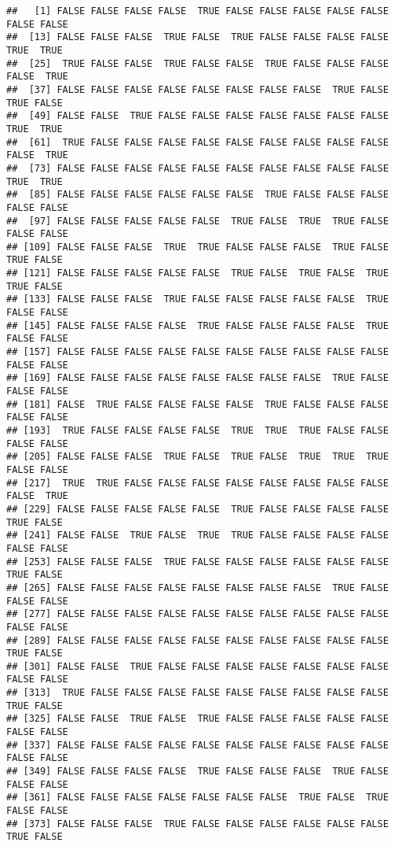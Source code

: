 \documentclass[
]{book}
\begin{document}
\begin{verbatim}
##   [1] FALSE FALSE FALSE FALSE  TRUE FALSE FALSE FALSE FALSE FALSE FALSE FALSE
##  [13] FALSE FALSE FALSE  TRUE FALSE  TRUE FALSE FALSE FALSE FALSE  TRUE  TRUE
##  [25]  TRUE FALSE FALSE  TRUE FALSE FALSE  TRUE FALSE FALSE FALSE FALSE  TRUE
##  [37] FALSE FALSE FALSE FALSE FALSE FALSE FALSE FALSE  TRUE FALSE  TRUE FALSE
##  [49] FALSE FALSE  TRUE FALSE FALSE FALSE FALSE FALSE FALSE FALSE  TRUE  TRUE
##  [61]  TRUE FALSE FALSE FALSE FALSE FALSE FALSE FALSE FALSE FALSE FALSE  TRUE
##  [73] FALSE FALSE FALSE FALSE FALSE FALSE FALSE FALSE FALSE FALSE  TRUE  TRUE
##  [85] FALSE FALSE FALSE FALSE FALSE FALSE  TRUE FALSE FALSE FALSE FALSE FALSE
##  [97] FALSE FALSE FALSE FALSE FALSE  TRUE FALSE  TRUE  TRUE FALSE FALSE FALSE
## [109] FALSE FALSE FALSE  TRUE  TRUE FALSE FALSE FALSE  TRUE FALSE  TRUE FALSE
## [121] FALSE FALSE FALSE FALSE FALSE  TRUE FALSE  TRUE FALSE  TRUE  TRUE FALSE
## [133] FALSE FALSE FALSE  TRUE FALSE FALSE FALSE FALSE FALSE  TRUE FALSE FALSE
## [145] FALSE FALSE FALSE FALSE  TRUE FALSE FALSE FALSE FALSE  TRUE FALSE FALSE
## [157] FALSE FALSE FALSE FALSE FALSE FALSE FALSE FALSE FALSE FALSE FALSE FALSE
## [169] FALSE FALSE FALSE FALSE FALSE FALSE FALSE FALSE  TRUE FALSE FALSE FALSE
## [181] FALSE  TRUE FALSE FALSE FALSE FALSE  TRUE FALSE FALSE FALSE FALSE FALSE
## [193]  TRUE FALSE FALSE FALSE FALSE  TRUE  TRUE  TRUE FALSE FALSE FALSE FALSE
## [205] FALSE FALSE FALSE  TRUE FALSE  TRUE FALSE  TRUE  TRUE  TRUE FALSE FALSE
## [217]  TRUE  TRUE FALSE FALSE FALSE FALSE FALSE FALSE FALSE FALSE FALSE  TRUE
## [229] FALSE FALSE FALSE FALSE FALSE  TRUE FALSE FALSE FALSE FALSE  TRUE FALSE
## [241] FALSE FALSE  TRUE FALSE  TRUE  TRUE FALSE FALSE FALSE FALSE FALSE FALSE
## [253] FALSE FALSE FALSE  TRUE FALSE FALSE FALSE FALSE FALSE FALSE  TRUE FALSE
## [265] FALSE FALSE FALSE FALSE FALSE FALSE FALSE FALSE  TRUE FALSE FALSE FALSE
## [277] FALSE FALSE FALSE FALSE FALSE FALSE FALSE FALSE FALSE FALSE FALSE FALSE
## [289] FALSE FALSE FALSE FALSE FALSE FALSE FALSE FALSE FALSE FALSE  TRUE FALSE
## [301] FALSE FALSE  TRUE FALSE FALSE FALSE FALSE FALSE FALSE FALSE FALSE FALSE
## [313]  TRUE FALSE FALSE FALSE FALSE FALSE FALSE FALSE FALSE FALSE  TRUE FALSE
## [325] FALSE FALSE  TRUE FALSE  TRUE FALSE FALSE FALSE FALSE FALSE FALSE FALSE
## [337] FALSE FALSE FALSE FALSE FALSE FALSE FALSE FALSE FALSE FALSE FALSE FALSE
## [349] FALSE FALSE FALSE FALSE  TRUE FALSE FALSE FALSE  TRUE FALSE FALSE FALSE
## [361] FALSE FALSE FALSE FALSE FALSE FALSE FALSE  TRUE FALSE  TRUE FALSE FALSE
## [373] FALSE FALSE FALSE  TRUE FALSE FALSE FALSE FALSE FALSE FALSE  TRUE FALSE

\end{verbatim}
\end{document}
